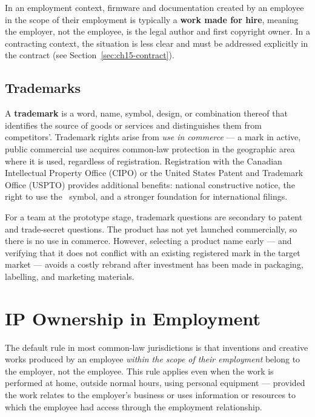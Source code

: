 In an employment
context, firmware and documentation created by an employee in the scope of their
employment is typically a \textbf{work made for hire}, meaning the employer, not
the employee, is the legal author and first copyright owner.
In a contracting context, the situation is less clear and must be addressed
explicitly in the contract (see Section~\ref{sec:ch15-contract}).

\subsection{Trademarks}
\label{subsec:ch15-trademarks}

A \textbf{trademark} is a word, name, symbol, design, or
combination thereof that identifies the source of goods or services and
distinguishes them from competitors'.
Trademark rights arise from \emph{use in commerce} --- a mark in active, public
commercial use acquires common-law protection in the geographic area where it is
used, regardless of registration.
Registration with the Canadian Intellectual Property Office (CIPO) or the United
States Patent and Trademark Office (USPTO) provides additional benefits: national
constructive notice, the right to use the \textregistered\ symbol, and a stronger
foundation for international filings.

For a team at the prototype stage, trademark questions are secondary to patent and
trade-secret questions.
The product has not yet launched commercially, so there is no use in commerce.
However, selecting a product name early --- and verifying that it does not conflict
with an existing registered mark in the target market --- avoids a costly rebrand
after investment has been made in packaging, labelling, and marketing materials.

\section{IP Ownership in Employment}
\label{sec:ch15-ownership}

The default rule in
most common-law jurisdictions is that inventions and creative works produced by an
employee \emph{within the scope of their employment} belong to the employer, not
the employee.
This rule applies even when the work is performed at home, outside normal hours,
using personal equipment --- provided the work relates to the employer's business
or uses information or resources to which the employee had access through the
employment relationship.

